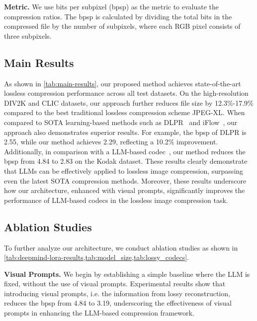 \textbf{Metric.} We use bits per subpixel (bpsp) as the metric to evaluate the compression ratios. The bpsp is calculated by dividing the total bits in the compressed file by the number of subpixels, where each RGB pixel consists of three subpixels.

\subsection{Main Results}

As shown in \cref{tab:main-results}, our proposed method achieves state-of-the-art lossless compression performance across all test datasets. On the high-resolution DIV2K and CLIC datasets, our approach further reduces file size by 12.3\%-17.9\% compared to the best traditional lossless compression scheme JPEG-XL. When compared to SOTA learning-based methods such as DLPR~\cite{bai2024deep} and iFlow~\cite{zhang2021iflow}, our approach also demonstrates superior results. For example, the bpsp of DLPR is 2.55, while our method achieves 2.29, reflecting a 10.2\% improvement.
Additionally, in comparison with a LLM-based codec~\cite{deletang2023language}, our method reduces the bpsp from 4.84 to 2.83 on the Kodak dataset. 
These results clearly demonstrate that LLMs can be effectively applied to lossless image compression, surpassing even the latest SOTA compression methods. Moreover, these results underscore how our architecture, enhanced with visual prompts, significantly improves the performance of LLM-based codecs in the lossless image compression task.

\subsection{Ablation Studies}\label{subsec:ablation}
To further analyze our architecture, we conduct ablation studies as shown in \cref{tab:deepmind-lora-results,tab:model_size,tab:lossy_codecs}.

\textbf{Visual Prompts.} 
We begin by establishing a simple baseline where the LLM is fixed, without the use of visual prompts. 
Experimental results show that introducing visual prompts, i.e. the information from lossy reconstruction, reduces the bpsp from 4.84 to 3.19, underscoring the effectiveness of visual prompts in enhancing the LLM-based compression framework.

